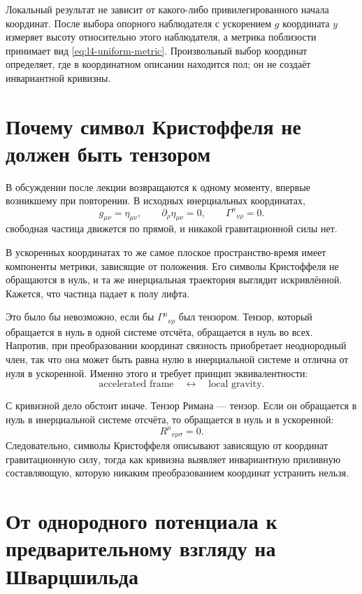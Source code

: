Локальный результат не зависит от какого-либо привилегированного начала координат. После выбора опорного наблюдателя с ускорением \(g\) координата \(y\) измеряет высоту относительно этого наблюдателя, а метрика поблизости принимает вид \eqref{eq:l4-uniform-metric}. Произвольный выбор координат определяет, где в координатном описании находится пол; он не создаёт инвариантной кривизны.

\section{Почему символ Кристоффеля не должен быть тензором}

В обсуждении после лекции возвращаются к одному моменту, впервые возникшему при повторении. В исходных инерциальных координатах,
\begin{equation}
g_{\mu\nu}=\eta_{\mu\nu},
\qquad
\partial_\rho\eta_{\mu\nu}=0,
\qquad
\Gamma^\mu{}_{\nu\rho}=0.
\end{equation}
свободная частица движется по прямой, и никакой гравитационной силы нет.

В ускоренных координатах то же самое плоское пространство-время имеет компоненты метрики, зависящие от положения. Его символы Кристоффеля не обращаются в нуль, и та же инерциальная траектория выглядит искривлённой. Кажется, что частица падает к полу лифта.

Это было бы невозможно, если бы \(\Gamma^\mu{}_{\nu\rho}\) был тензором. Тензор, который обращается в нуль в одной системе отсчёта, обращается в нуль во всех. Напротив, при преобразовании координат связность приобретает неоднородный член, так что она может быть равна нулю в инерциальной системе и отлична от нуля в ускоренной. Именно этого и требует принцип эквивалентности:
\begin{equation}
\text{accelerated frame}
\quad\longleftrightarrow\quad
\text{local gravity}.
\end{equation}

С кривизной дело обстоит иначе. Тензор Римана — тензор. Если он обращается в нуль в инерциальной системе отсчёта, то обращается в нуль и в ускоренной:
\begin{equation}
R^\mu{}_{\nu\rho\sigma}=0.
\end{equation}
Следовательно, символы Кристоффеля описывают зависящую от координат гравитационную силу, тогда как кривизна выявляет инвариантную приливную составляющую, которую никаким преобразованием координат устранить нельзя.

\section{От однородного потенциала к предварительному взгляду на Шварцшильда}

